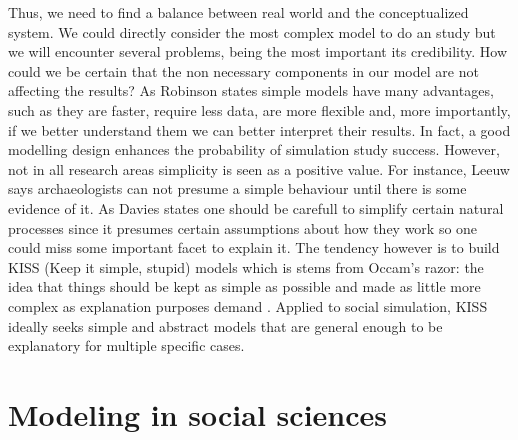 \documentclass{report}
\begin{document}
Thus, we need to find a balance between real world and the conceptualized system. We could directly consider the most complex model to do an study
but we will encounter several problems, being the most important its credibility. How could we be certain that the non necessary components in 
our model are not affecting the results? As Robinson \cite{Robinson2008} states simple models have many advantages, such as they are faster, require 
less data, are more flexible and, more importantly, if we better understand them we can better interpret their results.
In fact, a good modelling design enhances the probability of simulation study success. However, not in all research areas simplicity is seen
as a positive value. For instance, Leeuw \cite{Leeuw2004} says archaeologists can not presume a simple behaviour until there is some evidence 
of it. As Davies \cite{Davies2003} states one should be carefull to simplify certain natural processes 
since it presumes certain assumptions about how they work so one could miss some important facet to explain it. The tendency however is to build
KISS (Keep it simple, stupid) models which is stems from Occam’s razor: the idea that things should be kept as simple
as possible and made as little more complex as explanation purposes demand \cite{Axelrod1997a}. Applied
to social simulation, KISS ideally seeks simple and abstract models that are general enough to be explanatory for multiple specific cases.\\



\section{Modeling in social sciences}
\label{sec:modelsinSC}
\end{document}
